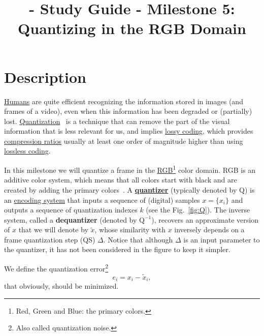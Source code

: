 
\title{\SM{} - Study Guide - Milestone 5: Quantizing in the RGB Domain}

\maketitle

\tableofcontents

\section{Description}
\href{https://en.wikipedia.org/wiki/Visual_system}{Humans} are quite
efficient recognizing the information stored in images (and frames of
a video), even when this information has been degraded or (partially)
lost. \href{https://en.wikipedia.org/wiki/Quantization_(signal_processing)}{Quantization}~\cite{sayood2017introduction,vetterli2014foundations}
is a technique that can remove the part of the visual information that
is less relevant for us, and implies
\href{https://en.wikipedia.org/wiki/Lossy_compression}{lossy coding},
which provides
\href{https://en.wikipedia.org/wiki/Data_compression_ratio}{compression
  ratios} usually at least one order of magnitude higher than using
\href{https://en.wikipedia.org/wiki/Lossless_compression}{lossless
  coding}.

In this milestone we will quantize a frame in the
\href{https://en.wikipedia.org/wiki/RGB_color_model}{RGB\footnote{Red,
  Green and Blue: the primary colors.} color domain}. RGB is an additive color system, which means that all colors start with black and are created by adding the primary colors~\cite{burger2016digital}. A
\href{https://en.wikipedia.org/wiki/Quantization_(signal_processing)}{\textbf{quantizer}}
(typically denoted by $\text{Q}$) is an
\href{https://en.wikipedia.org/wiki/Data_compression}{encoding system}
that inputs a sequence of (digital) samples $x=\{x_i\}$ and outputs a
sequence of quantization indexes $k$ (see the Fig.~\ref{fig:Q}). The
inverse system, called a \textbf{dequantizer} (denoted by
$\text{Q}^{-1}$), recovers an approximate version of $x$ that we will
denote by $\tilde{x}$, whose similarity with $x$ inversely depends on
a frame quantization step (QS) $\Delta$. Notice that although $\Delta$
is an input parameter to the quantizer, it has not been considered in
the figure to keep it simpler.

We define the quantization error\footnote{Also called quantization
noise.}
\begin{equation}
  e_i = x_i - \tilde{x}_i,
\end{equation}
that obviously, should be minimized.

